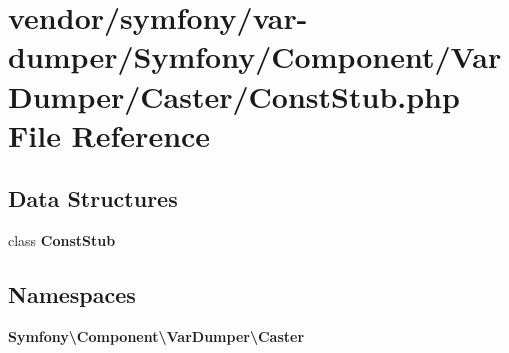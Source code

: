 \section{vendor/symfony/var-\/dumper/\+Symfony/\+Component/\+Var\+Dumper/\+Caster/\+Const\+Stub.php File Reference}
\label{_const_stub_8php}
\subsection*{Data Structures}
\begin{DoxyCompactItemize}
\item 
class {\bf Const\+Stub}
\end{DoxyCompactItemize}
\subsection*{Namespaces}
\begin{DoxyCompactItemize}
\item 
 {\bf Symfony\textbackslash{}\+Component\textbackslash{}\+Var\+Dumper\textbackslash{}\+Caster}
\end{DoxyCompactItemize}
